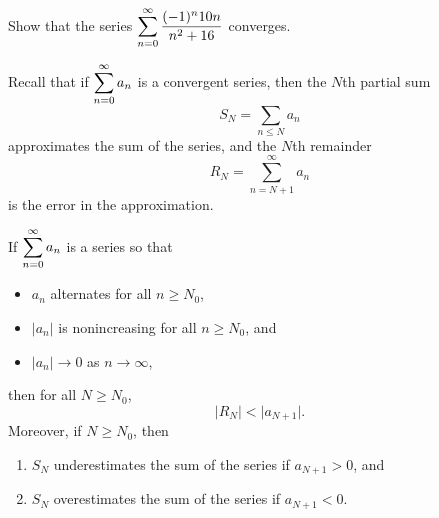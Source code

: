 \begin{example}
Show that the series $\displaystyle\sum_{n=0}^\infty\frac{(-1)^n 10n}{n^2+16}$ converges.
\end{example}
\ifdefined\SOLUTION
{}
\fi

\newpage

\begin{remark}
Recall that if $\displaystyle\sum_{n=0}^\infty a_n$ is a convergent series, then the $N$th partial sum
\begin{equation*}
S_N = \sum_{n\le N} a_n
\end{equation*}
approximates the sum of the series, and the $N$th remainder
\begin{equation*}
 R_N = \sum_{n=N+1}^\infty a_n
\end{equation*}
is the error in the approximation.
\end{remark}

\begin{theorem}
If $\displaystyle\sum_{n=0}^\infty a_n$ is a series so that
\begin{itemize}
\item $a_n$ alternates for all $n\ge N_0$,
\item $|a_n|$ is nonincreasing for all $n\ge N_0$, and
\item $|a_n|\to 0$ as $n\to\infty$,
\end{itemize}
then for all $N\ge N_0$, 
\begin{equation*}
\Big| R_N \Big| < \Big| a_{N+1}\Big|.
\end{equation*}
Moreover, if $N\ge N_0$, then
\begin{enumerate}
\item $S_N$ underestimates the sum of the series if $a_{N+1}>0$, and
\item $S_N$ overestimates the sum of the series if $a_{N+1}<0$.
\end{enumerate}
\end{theorem}

